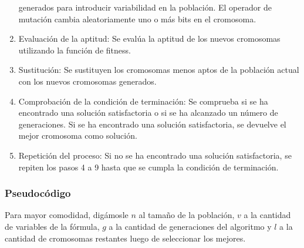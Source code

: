 \documentclass{article}
\begin{document}
\begin{enumerate}
            generados para introducir variabilidad en la población. El operador de mutación cambia 
            aleatoriamente uno o más bits en el cromosoma.
            \item Evaluación de la aptitud: Se evalúa la aptitud de los nuevos cromosomas utilizando 
            la función de fitness.
            \item Sustitución: Se sustituyen los cromosomas menos aptos de la población actual con 
            los nuevos cromosomas generados.
            \item Comprobación de la condición de terminación: Se comprueba si se ha encontrado una 
            solución satisfactoria o si se ha alcanzado un número de generaciones. 
            Si se ha encontrado una solución satisfactoria, se devuelve el mejor cromosoma como solución.
            \item Repetición del proceso: Si no se ha encontrado una solución satisfactoria, 
            se repiten los pasos 4 a 9 hasta que se cumpla la condición de terminación.
        \end{enumerate}
        
        \subsubsection*{Pseudocódigo}
            Para mayor comodidad, digámosle $n$ al tamaño de la población, $v$ a la cantidad de variables de 
            la fórmula, $g$ a la cantidad de generaciones del algoritmo y $l$ a la cantidad de cromosomas restantes 
            luego de seleccionar los mejores.
            
\end{document}
